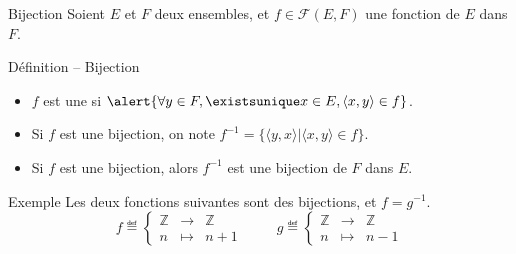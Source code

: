 
\begingroup


\begin{frame}{Bijection}
  Soient $E$ et $F$ deux ensembles, et $f\in \mathscr{F}(E, F)$ une fonction de $E$ dans $F$.
  \begin{block}{Définition -- Bijection}
    \begin{itemize}
    \item $f$ est une  si $\alert{\forall y\in F, \existsunique x\in E, \langle x, y \rangle \in f}$. 
    \item Si $f$ est une bijection, on note $f^{-1} = \{\langle y, x \rangle | \langle x, y \rangle \in f\}$. 
    \item Si $f$ est une bijection, alors $f^{-1}$ est une bijection de $F$ dans $E$. 
    \end{itemize}
  \end{block}
  
  \begin{exampleblock}{Exemple}
    Les deux fonctions suivantes sont des bijections, et $f = g^{-1}$.
    $$
    f \eqdef \left\{\begin{array}{rcl}
    \mathbb{Z} &\rightarrow& \mathbb{Z}\\
    n &\mapsto & n+1
    \end{array}\right.
    \hspace{1cm}
    g \eqdef \left\{\begin{array}{rcl}
    \mathbb{Z} &\rightarrow& \mathbb{Z}\\
    n &\mapsto & n-1
    \end{array}\right.
    $$
  \end{exampleblock}

\end{frame}

\endgroup
